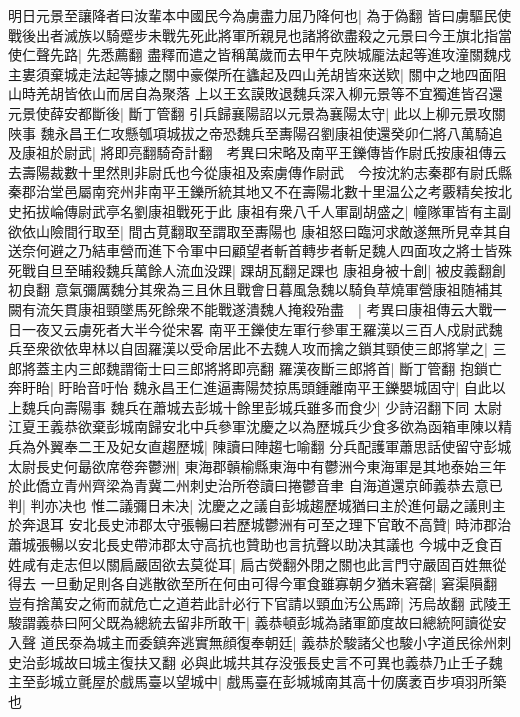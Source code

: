 明日元景至讓降者曰汝輩本中國民今為虜盡力屈乃降何也|{
	為于偽翻}
皆曰虜驅民使戰後出者滅族以騎蹙步未戰先死此將軍所親見也諸將欲盡殺之元景曰今王旗北指當使仁聲先路|{
	先悉薦翻}
盡釋而遣之皆稱萬歲而去甲午克陜城龎法起等進攻潼關魏戍主婁須棄城走法起等據之關中豪傑所在蠭起及四山羌胡皆來送欵|{
	關中之地四面阻山時羌胡皆依山而居自為聚落}
上以王玄謨敗退魏兵深入柳元景等不宜獨進皆召還元景使薛安都斷後|{
	斷丁管翻}
引兵歸襄陽詔以元景為襄陽太守|{
	此以上柳元景攻關陜事}
魏永昌王仁攻懸瓠項城拔之帝恐魏兵至夀陽召劉康祖使還癸卯仁將八萬騎追及康祖於尉武|{
	將即亮翻騎奇計翻　考異曰宋略及南平王鑠傳皆作尉氏按康祖傳云去壽陽裁數十里然則非尉氏也今從康祖及索虜傳作尉武　今按沈約志秦郡有尉氏縣秦郡治堂邑屬南兖州非南平王鑠所統其地又不在壽陽北數十里温公之考覈精矣按北史拓拔崘傳尉武亭名劉康祖戰死于此}
康祖有衆八千人軍副胡盛之|{
	幢隊軍皆有主副}
欲依山險間行取至|{
	間古莧翻取至謂取至夀陽也}
康祖怒曰臨河求敵遂無所見幸其自送奈何避之乃結車營而進下令軍中曰顧望者斬首轉步者斬足魏人四面攻之將士皆殊死戰自旦至晡殺魏兵萬餘人流血没踝|{
	踝胡瓦翻足踝也}
康祖身被十創|{
	被皮義翻創初良翻}
意氣彌厲魏分其衆為三且休且戰會日暮風急魏以騎負草燒軍營康祖随補其闕有流矢貫康祖頸墜馬死餘衆不能戰遂潰魏人掩殺殆盡　|{
	考異曰康祖傳云大戰一日一夜又云虜死者大半今從宋畧}
南平王鑠使左軍行參軍王羅漢以三百人戍尉武魏兵至衆欲依卑林以自固羅漢以受命居此不去魏人攻而擒之鎖其頸使三郎將掌之|{
	三郎將蓋主内三郎魏謂衛士曰三郎將將即亮翻}
羅漢夜斷三郎將首|{
	斷丁管翻}
抱鎖亡奔盱眙|{
	盱眙音吁怡}
魏永昌王仁進逼夀陽焚掠馬頭鍾離南平王鑠嬰城固守|{
	自此以上魏兵向壽陽事}
魏兵在蕭城去彭城十餘里彭城兵雖多而食少|{
	少詩沼翻下同}
太尉江夏王義恭欲棄彭城南歸安北中兵參軍沈慶之以為歷城兵少食多欲為函箱車陳以精兵為外翼奉二王及妃女直趨歷城|{
	陳讀曰陣趨七喻翻}
分兵配護軍蕭思話使留守彭城太尉長史何朂欲席卷奔鬱洲|{
	東海郡贑榆縣東海中有鬱洲今東海軍是其地泰始三年於此僑立青州齊梁為青冀二州刺史治所卷讀曰捲鬱音聿}
自海道還京師義恭去意已判|{
	判亦决也}
惟二議彌日未决|{
	沈慶之之議自彭城趨歷城猶曰主於進何朂之議則主於奔退耳}
安北長史沛郡太守張暢曰若歷城鬱洲有可至之理下官敢不高贊|{
	時沛郡治蕭城張暢以安北長史帶沛郡太守高抗也贊助也言抗聲以助决其議也}
今城中乏食百姓咸有走志但以關扃嚴固欲去莫從耳|{
	扃古熒翻外閉之關也此言門守嚴固百姓無從得去}
一旦動足則各自逃散欲至所在何由可得今軍食雖寡朝夕猶未窘罄|{
	窘渠隕翻}
豈有捨萬安之術而就危亡之道若此計必行下官請以頸血汚公馬蹄|{
	汚烏故翻}
武陵王駿謂義恭曰阿父既為總統去留非所敢干|{
	義恭頓彭城為諸軍節度故曰總統阿讀從安入聲}
道民沗為城主而委鎮奔逃實無顔復奉朝廷|{
	義恭於駿諸父也駿小字道民徐州刺史治彭城故曰城主復扶又翻}
必與此城共其存没張長史言不可異也義恭乃止壬子魏主至彭城立氈屋於戲馬臺以望城中|{
	戲馬臺在彭城城南其高十仞廣袤百步項羽所築也}
